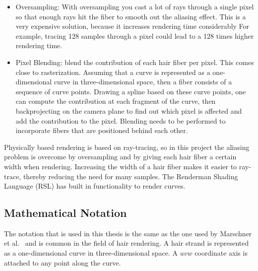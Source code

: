 \documentclass[11pt,a4paper]{report}
\begin{document}
\begin{itemize}
\item Oversampling: With oversampling you cast a lot of rays through a single pixel so that enough rays hit the fiber to smooth out the aliasing effect. This is a very expensive solution, because it increases rendering time considerably For example, tracing 128 samples through a pixel could lead to a 128 times higher rendering time.



\item Pixel Blending: blend the contribution of each hair fiber per pixel. This comes close to rasterization. Assuming that a curve is represented as a one-dimensional curve in three-dimensional space, then a fiber consists of a sequence of curve points. Drawing a spline based on these curve points, one can compute the contribution at each fragment of the curve, then backprojecting on the camera plane to find out which pixel is affected and add the contribution to the pixel. Blending needs to be performed to incorporate fibers that are positioned behind each other.

\end{itemize}

Physically based rendering is based on ray-tracing, so in this project the aliasing problem is overcome by oversampling and by giving each hair fiber a certain width when rendering. Increasing the width of a hair fiber makes it easier to ray-trace, thereby reducing the need for many samples. The Renderman Shading Language (RSL) has built in functionality to render curves. 

\subsection{Mathematical Notation}

The notation that is used in this thesis is the same as the one used by Marschner et al.~\cite{marschner} and is common in the field of hair rendering. A hair strand is represented as a one-dimensional curve in three-dimensional space. A $uvw$ coordinate axis is attached to any point along the curve.
\end{document}
